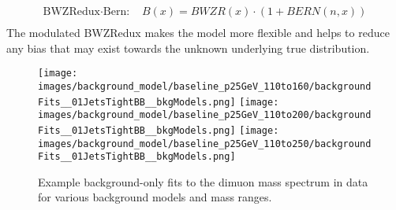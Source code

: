 \begin{align}
        \label{eq:BWZReduxPoly}
        \text{BWZRedux}\cdot\text{Bern: }& {B(x)} = BWZR(x) \cdot \left(1+ BERN(n,x)\right) \\
\end{align}
The modulated BWZRedux makes the model more flexible and helps to reduce any bias that may exist towards the unknown underlying true distribution.
\begin{figure}[hbp]
     \centering
     \texttt{[image: images/background\_model/baseline\_p25GeV\_110to160/backgroundFits\_\_01JetsTightBB\_\_bkgModels.png]}
     \texttt{[image: images/background\_model/baseline\_p25GeV\_110to200/backgroundFits\_\_01JetsTightBB\_\_bkgModels.png]}
     \texttt{[image: images/background\_model/baseline\_p25GeV\_110to250/backgroundFits\_\_01JetsTightBB\_\_bkgModels.png]}
     \caption[Some background-only fits.]
     {Example background-only fits to the dimuon mass spectrum in data for various background models and mass ranges.}
     \label{bkgmodel:exampleModels}
\end{figure}

